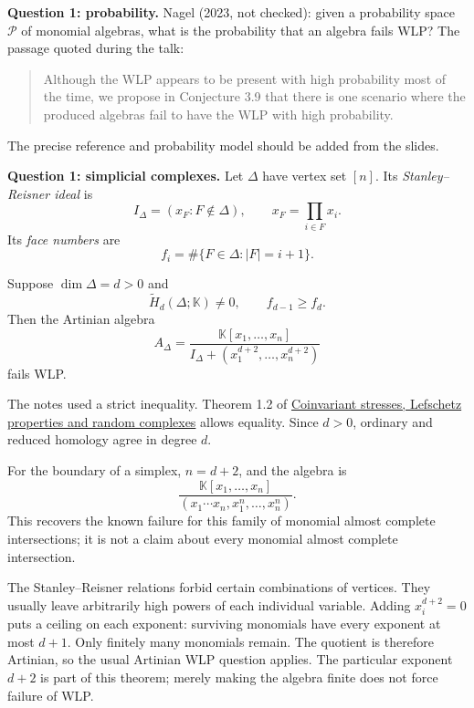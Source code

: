 \medskip\noindent
\textbf{Question 1: probability.}
Nagel (2023, not checked): given a
probability space $\mathcal P$ of
monomial algebras, what is the probability
that an algebra fails WLP?
The passage quoted during the talk:
\begin{quote}
Although the WLP appears to be present
with high probability most of the time,
we propose in Conjecture 3.9 that there
is one scenario where the produced
algebras fail to have the WLP with
high probability.
\end{quote}
The precise reference and probability
model should be added from the slides.

\medskip\noindent
\textbf{Question 1: simplicial complexes.}
Let $\Delta$ have vertex set $[n]$.
Its \emph{Stanley--Reisner ideal} is
$$
I_\Delta=(x_F:F\notin\Delta),
\qquad
x_F=\prod_{i\in F}x_i.
$$
Its \emph{face numbers} are
$$
f_i=\#\{F\in\Delta:|F|=i+1\}.
$$

\begin{theorem}[Holleben, 2026]
\label{theorem-holleben-homology-wlp}
Suppose $\dim\Delta=d>0$ and
$$
\widetilde H_d(\Delta;\mathbb K)\ne0,
\qquad f_{d-1}\geq f_d.
$$
Then the Artinian algebra
$$
A_\Delta=
\frac{\mathbb K[x_1,\ldots,x_n]}
{I_\Delta+
(x_1^{d+2},\ldots,x_n^{d+2})}
$$
fails WLP.
\end{theorem}

The notes used a strict
inequality. Theorem 1.2 of
\href{%
https://arxiv.org/abs/2501.12108%
}{Coinvariant stresses, Lefschetz
properties and random complexes}
allows equality.
Since $d>0$, ordinary and reduced
homology agree in degree $d$.

For the boundary of a simplex,
$n=d+2$, and the algebra is
$$
\frac{\mathbb K[x_1,\ldots,x_n]}
{(x_1\cdots x_n,x_1^n,\ldots,x_n^n)}.
$$
This recovers the known failure for
this family of monomial almost complete
intersections; it is not a claim about
every monomial almost complete
intersection.

\begin{remark}
\label{remark-holleben-talk-powers}
The Stanley--Reisner relations forbid
certain combinations of vertices.
They usually leave arbitrarily high
powers of each individual variable.
Adding $x_i^{d+2}=0$ puts a ceiling on
each exponent: surviving monomials have
every exponent at most $d+1$.
Only finitely many monomials remain.
The quotient is therefore Artinian,
so the usual Artinian WLP question
applies. The particular exponent $d+2$
is part of this theorem; merely making
the algebra finite does not force
failure of WLP.
\end{remark}

